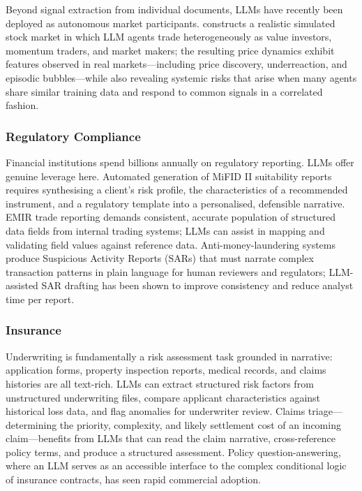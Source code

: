 \begin{context}
Beyond signal extraction from individual documents, LLMs have recently been deployed as autonomous market participants. \citet{LopezLira2025trade} constructs a realistic simulated stock market in which LLM agents trade heterogeneously as value investors, momentum traders, and market makers; the resulting price dynamics exhibit features observed in real markets—including price discovery, underreaction, and episodic bubbles—while also revealing systemic risks that arise when many agents share similar training data and respond to common signals in a correlated fashion.

\subsubsection*{Regulatory Compliance}
Financial institutions spend billions annually on regulatory reporting. LLMs offer genuine leverage here. Automated generation of MiFID II suitability reports requires synthesising a client's risk profile, the characteristics of a recommended instrument, and a regulatory template into a personalised, defensible narrative. EMIR trade reporting demands consistent, accurate population of structured data fields from internal trading systems; LLMs can assist in mapping and validating field values against reference data. Anti-money-laundering systems produce Suspicious Activity Reports (SARs) that must narrate complex transaction patterns in plain language for human reviewers and regulators; LLM-assisted SAR drafting has been shown to improve consistency and reduce analyst time per report.

\subsubsection*{Insurance}
Underwriting is fundamentally a risk assessment task grounded in narrative: application forms, property inspection reports, medical records, and claims histories are all text-rich. LLMs can extract structured risk factors from unstructured underwriting files, compare applicant characteristics against historical loss data, and flag anomalies for underwriter review. Claims triage---determining the priority, complexity, and likely settlement cost of an incoming claim---benefits from LLMs that can read the claim narrative, cross-reference policy terms, and produce a structured assessment. Policy question-answering, where an LLM serves as an accessible interface to the complex conditional logic of insurance contracts, has seen rapid commercial adoption.


\end{context}

